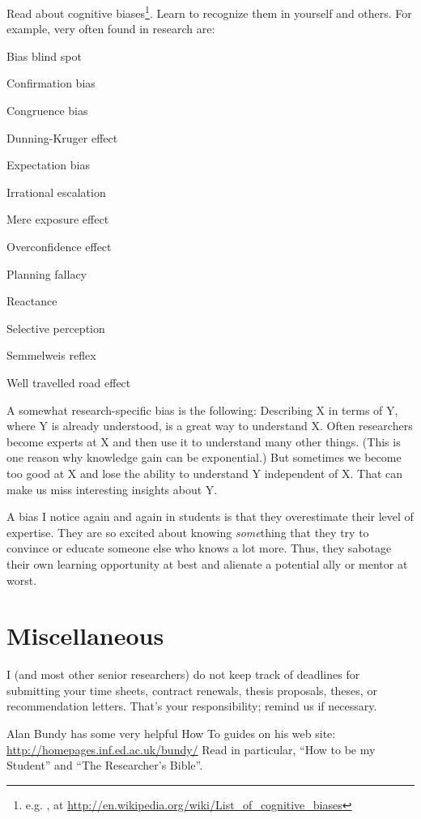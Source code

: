 \documentclass[12pt]{article}
\begin{document}
Read about cognitive biases\footnote{e.g. , at \url{http://en.wikipedia.org/wiki/List_of_cognitive_biases}}.
Learn to recognize them in yourself and others. For example, very often found in research are:
\begin{compactitem}
\item Bias blind spot
\item Confirmation bias
\item Congruence bias
\item Dunning-Kruger effect
\item Expectation bias
\item Irrational escalation
\item Mere exposure effect
\item Overconfidence effect
\item Planning fallacy
\item Reactance
\item Selective perception
\item Semmelweis reflex
\item Well travelled road effect
\end{compactitem}
\medskip

A somewhat research-specific bias is the following:
Describing X in terms of Y, where Y is already understood, is a great way to understand X.
Often researchers become experts at X and then use it to understand many other things. (This is one reason why knowledge gain can be exponential.)
But sometimes we become too good at X and lose the ability to understand Y independent of X.
That can make us miss interesting insights about Y.
\medskip

A bias I notice again and again in students is that they overestimate their level of expertise.
They are so excited about knowing \emph{some}thing that they try to convince or educate someone else who knows a lot more.
Thus, they sabotage their own learning opportunity at best and alienate a potential ally or mentor at worst.

\section{Miscellaneous}

I (and most other senior researchers) do not keep track of deadlines for submitting your time sheets, contract renewals, thesis proposals, theses, or recommendation letters. That's your responsibility; remind us if necessary.
\medskip

Alan Bundy has some very helpful How To guides on his web site: \url{http://homepages.inf.ed.ac.uk/bundy/} Read in particular, ``How to be my Student'' and ``The Researcher's Bible''.
\end{document}
